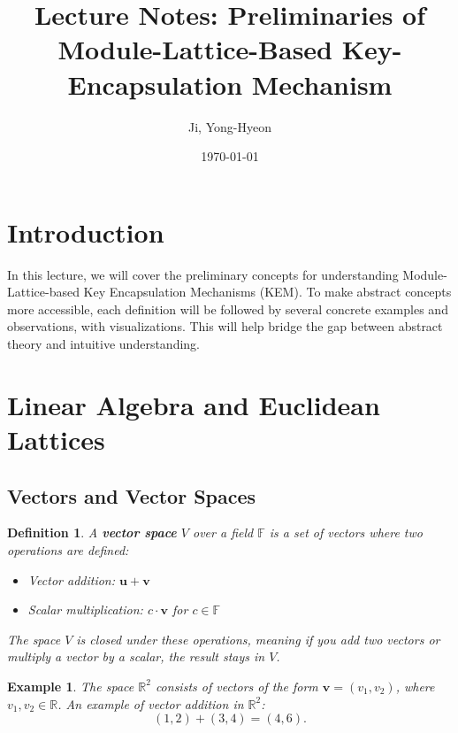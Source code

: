 \documentclass[12pt]{article}
\newtheorem{definition}{Definition}
\newtheorem{example}{Example}
\begin{document}
	
	\title{Lecture Notes: Preliminaries of Module-Lattice-Based Key-Encapsulation Mechanism}
	\author{Ji, Yong-Hyeon}
	\date{\today}
	\maketitle
	
	\tableofcontents  %
	\newpage

	\section{Introduction}
	
	In this lecture, we will cover the preliminary concepts for understanding Module-Lattice-based Key Encapsulation Mechanisms (KEM). To make abstract concepts more accessible, each definition will be followed by several concrete examples and observations, with visualizations. This will help bridge the gap between abstract theory and intuitive understanding.
	
	\section{Linear Algebra and Euclidean Lattices}
	
	\subsection{Vectors and Vector Spaces}
	
	\begin{definition}
		A \textbf{vector space} $V$ over a field $\mathbb{F}$ is a set of vectors where two operations are defined:
		\begin{itemize}
			\item Vector addition: $\mathbf{u} + \mathbf{v}$
			\item Scalar multiplication: $c \cdot \mathbf{v}$ for $c \in \mathbb{F}$
		\end{itemize}
		The space $V$ is closed under these operations, meaning if you add two vectors or multiply a vector by a scalar, the result stays in $V$.
	\end{definition}
	
	\begin{example}
		The space $\mathbb{R}^2$ consists of vectors of the form $\mathbf{v} = (v_1, v_2)$, where $v_1, v_2 \in \mathbb{R}$. An example of vector addition in $\mathbb{R}^2$:
		\[
		(1, 2) + (3, 4) = (4, 6).
		\]
	\end{example}
	
\end{document}
